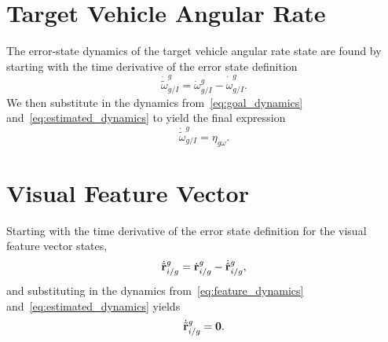 \section{Target Vehicle Angular Rate}
The error-state dynamics of the target vehicle angular rate state are found by
starting with the time derivative of the error state definition
\begin{equation}
  \dot{\tilde{\omega}}_{g/I}^g = \dot{\omega}_{g/I}^g -
  \dot{\hat{\omega}}_{g/I}^g.
\end{equation}
We then substitute in the dynamics from~\eqref{eq:goal_dynamics}
and~\eqref{eq:estimated_dynamics} to yield the final expression
\begin{equation}
  \dot{\tilde{\omega}}_{g/I}^g = \eta_{g\omega}. 
\end{equation}

\section{Visual Feature Vector}
Starting with the time derivative of the error state definition for the visual
feature vector states,
\begin{equation}
  \dot{\tilde{\mathrm{\mathbf{r}}}}_{i/g}^g = \dot{\mathrm{\mathbf{r}}}_{i/g}^g  -
  \dot{\hat{\mathrm{\mathbf{r}}}}_{i/g}^g,
\end{equation}
and substituting in the dynamics from~\eqref{eq:feature_dynamics}
and~\eqref{eq:estimated_dynamics} yields
\begin{equation}
  \dot{\tilde{\mathrm{\mathbf{r}}}}_{i/g}^g = \mathrm{\mathbf{0}}.
\end{equation}

